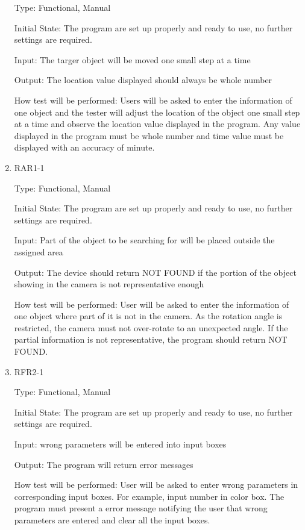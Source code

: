 \documentclass[12pt, titlepage]{article}
\begin{document}
\begin{enumerate}
Type: Functional, Manual
					
Initial State: The program are set up properly and ready to use, no further settings are required.
					
Input: The targer object will be moved one small step at a time 
					
Output: The location value displayed should always be whole number
					
How test will be performed: Users will be asked to enter the information of one object and the tester will adjust the location of the object one small step at a time and observe the location value displayed in the program. Any value displayed in the program must be whole number and time value must be displayed with an accuracy of minute.


\item{RAR1-1\\}

Type: Functional, Manual
					
Initial State: The program are set up properly and ready to use, no further settings are required.
					
Input: Part of the object to be searching for will be placed outside the assigned area 
					
Output: The device should return NOT FOUND if the portion of the object showing in the camera is not representative enough
					
How test will be performed: User will be asked to enter the information of one object where part of it is not in the camera. As the rotation angle is restricted, the camera must not over-rotate to an unexpected angle. If the partial information is not representative, the program should return NOT FOUND.


\item{RFR2-1\\}

Type: Functional, Manual
					
Initial State: The program are set up properly and ready to use, no further settings are required.
					
Input: wrong parameters will be entered into input boxes 
					
Output: The program will return error messages 
					
How test will be performed: User will be asked to enter wrong parameters in corresponding input boxes. For example, input number in color box. The program must present a error message notifying the user that wrong parameters are entered and clear all the input boxes.

\end{enumerate}
\end{document}
